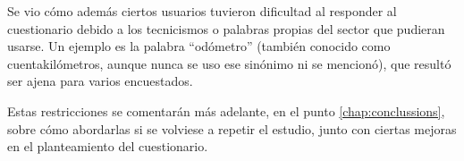 Se vio cómo además ciertos usuarios tuvieron dificultad al responder al cuestionario
debido a los tecnicismos o palabras propias del sector que pudieran usarse. Un
ejemplo es la palabra ``odómetro'' (también conocido como cuentakilómetros, aunque
nunca se uso ese sinónimo ni se mencionó), que resultó ser ajena para varios encuestados.

Estas restricciones se comentarán más adelante, en el punto \ref{chap:conclussions},
sobre cómo abordarlas si se volviese a repetir el estudio, junto con ciertas mejoras
en el planteamiento del cuestionario.
